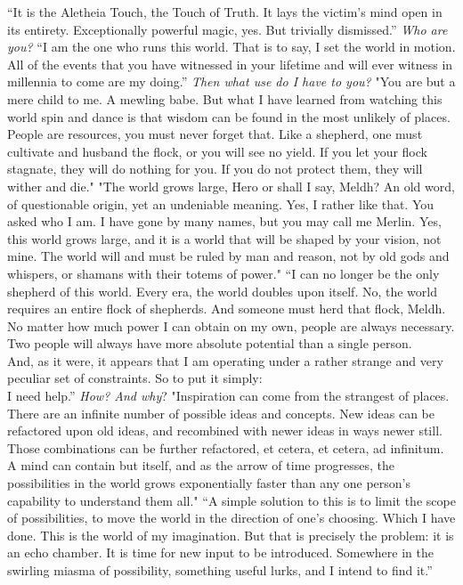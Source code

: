 \begin{flushright}
“It is the Aletheia Touch, the Touch of Truth. It lays the victim’s mind open in its entirety. Exceptionally powerful magic, yes. But trivially dismissed.”
\SmallVSpace
\emph{Who are you?}
\SmallVSpace
“I am the one who runs this world. That is to say, I set the world in motion. All of the events that you have witnessed in your lifetime and will ever witness in millennia to come are my doing.”
\SmallVSpace
\emph{Then what use do I have to you?}
\SmallVSpace
"You are but a mere child to me. A mewling babe. But what I have learned from watching this world spin and dance is that wisdom can be found in the most unlikely of places. People are resources, you must never forget that. Like a shepherd, one must cultivate and husband the flock, or you will see no yield. If you let your flock stagnate, they will do nothing for you. If you do not protect them, they will wither and die."
\SmallVSpace
"The world grows large, Hero{\el} or shall I say, Meldh? An old word, of questionable origin, yet an undeniable meaning. Yes, I rather like that. You asked who I am. I have gone by many names, but you may call me Merlin. Yes, this world grows large, and it is a world that will be shaped by your vision, not mine. The world will and must be ruled by man and reason, not by old gods and whispers, or shamans with their totems of power."
\SmallVSpace
“I can no longer be the only shepherd of this world. Every era, the world doubles upon itself. No, the world requires an entire flock of shepherds. And someone must herd that flock, Meldh. No matter how much power I can obtain on my own, people are always necessary. Two people will always have more absolute potential than a single person.\\And, as it were, it appears that I am operating under a rather strange and very peculiar set of constraints. So to put it simply:\\I need help.”
\SmallVSpace
\emph{How? And why}?
\SmallVSpace
"Inspiration can come from the strangest of places. There are an infinite number of possible ideas and concepts. New ideas can be refactored upon old ideas, and recombined with newer ideas in ways newer still. Those combinations can be further refactored, et cetera, et cetera, ad infinitum. A mind can contain but itself, and as the arrow of time progresses, the possibilities in the world grows exponentially faster than any one person’s capability to understand them all."
\SmallVSpace
“A simple solution to this is to limit the scope of possibilities, to move the world in the direction of one’s choosing. Which I have done. This is the world of my imagination. But that is precisely the problem: it is an echo chamber. It is time for new input to be introduced. Somewhere in the swirling miasma of possibility, something useful lurks, and I intend to find it.”

\end{flushright}
